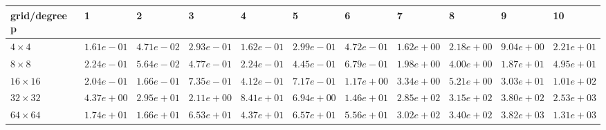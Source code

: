 \begin{tabular}{lllllllllll}
\hline
 grid/degree p   & 1          & 2          & 3          & 4          & 5          & 6          & 7          & 8          & 9          & 10         \\
\hline
 $4 \times 4$    & $1.61e-01$ & $4.71e-02$ & $2.93e-01$ & $1.62e-01$ & $2.99e-01$ & $4.72e-01$ & $1.62e+00$ & $2.18e+00$ & $9.04e+00$ & $2.21e+01$ \\
 $8 \times 8$    & $2.24e-01$ & $5.64e-02$ & $4.77e-01$ & $2.24e-01$ & $4.45e-01$ & $6.79e-01$ & $1.98e+00$ & $4.00e+00$ & $1.87e+01$ & $4.95e+01$ \\
 $16 \times 16$  & $2.04e-01$ & $1.66e-01$ & $7.35e-01$ & $4.12e-01$ & $7.17e-01$ & $1.17e+00$ & $3.34e+00$ & $5.21e+00$ & $3.03e+01$ & $1.01e+02$ \\
 $32 \times 32$  & $4.37e+00$ & $2.95e+01$ & $2.11e+00$ & $8.41e+01$ & $6.94e+00$ & $1.46e+01$ & $2.85e+02$ & $3.15e+02$ & $3.80e+02$ & $2.53e+03$ \\
 $64 \times 64$  & $1.74e+01$ & $1.66e+01$ & $6.53e+01$ & $4.37e+01$ & $6.57e+01$ & $5.56e+01$ & $3.02e+02$ & $3.40e+02$ & $3.82e+03$ & $1.31e+03$ \\
\hline
\end{tabular}